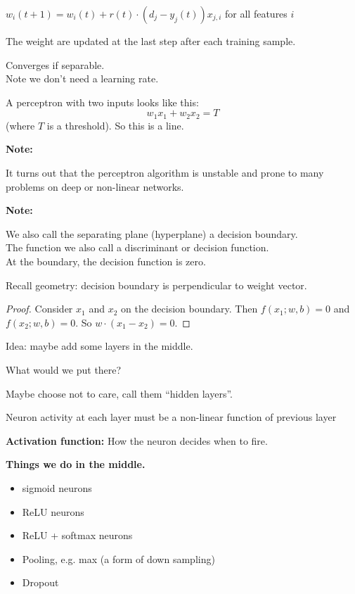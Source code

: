  $w_i(t+1) = w_i(t) + r(t)\cdot (d_j - y_j(t)) x_{j,i}$ for all features $i$

The weight are updated at the last step after each training sample.

Converges if separable.\\
Note we don't need a learning rate.

A perceptron with two inputs looks like this:
\begin{displaymath}
  w_1 x_1 + w_2 x_2 = T
\end{displaymath}
(where $T$ is a threshold).  So this is a line.


\bigskip
\textbf{Note:}

It turns out that the perceptron algorithm is unstable and prone to
many problems on deep or non-linear networks.


\bigskip
\textbf{Note:}

We also call the separating plane (hyperplane) a decision boundary. \\
The function we also call a discriminant or decision function.\\
At the boundary, the decision function is zero.

Recall geometry: decision boundary is perpendicular to weight vector.

\begin{proof}
  Consider $x_1$ and $x_2$ on the decision boundary.  Then
  $f(x_1; w, b) = 0$ and $f(x_2; w, b) = 0$.  So
  $w\cdot (x_1 - x_2) = 0$.
\end{proof}



Idea: maybe add some layers in the middle.

What would we put there?

Maybe choose not to care, call them ``hidden layers''.

Neuron activity at each layer must be a non-linear function of
previous layer



\bigskip
\textbf{Activation function:} How the neuron decides when to fire.

\bigskip
\textbf{Things we do in the middle.}
\begin{itemize}
\item sigmoid neurons
\item ReLU neurons
\item ReLU + softmax neurons
\item Pooling, e.g. max (a form of down sampling)
\item Dropout
\end{itemize}




